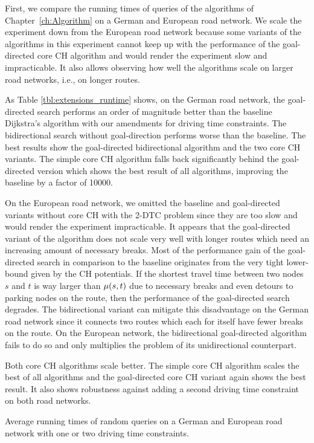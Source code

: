 First, we compare the running times of queries of the algorithms of Chapter~\ref{ch:Algorithm} on a German and European road network. We scale the experiment down from the European road network because some variants of the algorithms in this experiment cannot keep up with the performance of the goal-directed core CH algorithm and would render the experiment slow and impracticable. It also allows observing how well the algorithms scale on larger road networks, i.e., on longer routes.

As Table \ref{tbl:extensions_runtime} shows, on the German road network, the goal-directed search performs an order of magnitude better than the baseline Dijkstra's algorithm with our amendments for driving time constraints. The bidirectional search without goal-direction performs worse than the baseline. The best results show the goal-directed bidirectional algorithm and the two core CH variants. The simple core CH algorithm falls back significantly behind the goal-directed version which shows the best result of all algorithms, improving the baseline by a factor of \num{10000}.

On the European road network, we omitted the baseline and goal-directed variants without core CH with the 2-DTC problem since they are too slow and would render the experiment impracticable. It appears that the goal-directed variant of the algorithm does not scale very well with longer routes which need an increasing amount of necessary breaks. Most of the performance gain of the goal-directed search in comparison to the baseline originates from the very tight lower-bound given by the CH potentials. If the shortest travel time between two nodes $s$ and $t$ is way larger than $\mu(s,t)$ due to necessary breaks and even detours to parking nodes on the route, then the performance of the goal-directed search degrades. The bidirectional variant can mitigate this disadvantage on the German road network since it connects two routes which each for itself have fewer breaks on the route. On the European network, the bidirectional goal-directed algorithm fails to do so and only multiplies the problem of its unidirectional counterpart.

Both core CH algorithms scale better. The simple core CH algorithm scales the best of all algorithms and the goal-directed core CH variant again shows the best result. It also shows robustness against adding a second driving time constraint on both road networks.

\begin{table}[hbtp]
	\centering
	
	\caption{Average running times of random queries on a German and European road network with one or two driving time constraints.}
	\label{tbl:extensions_runtime}
\end{table}

